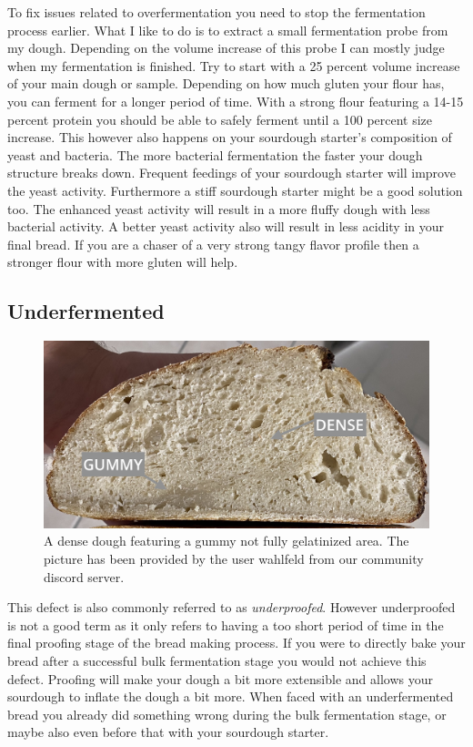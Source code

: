 To fix issues related to overfermentation you need to stop the fermentation process
earlier. What I like to do is to extract a small fermentation probe from my dough.
Depending on the volume increase of this probe I can mostly judge when my fermentation
is finished. Try to start with a 25 percent volume increase of your main dough or sample.
Depending on how much gluten your flour has, you can ferment for a longer period of time.
With a strong flour featuring a 14-15 percent protein you should be able to safely
ferment until a 100 percent size increase. This however also happens on your
sourdough starter's composition of yeast and bacteria. The more bacterial fermentation
the faster your dough structure breaks down. Frequent feedings of your sourdough
starter will improve the yeast activity. Furthermore a stiff sourdough starter
might be a good solution too. The enhanced yeast activity will result in a more fluffy
dough with less bacterial activity. A better yeast activity also will result
in less acidity in your final bread. If you are a chaser of a very strong tangy
flavor profile then a stronger flour with more gluten will help.


\subsection{Underfermented}

\begin{figure}
  \includegraphics[width=\textwidth]{fermented-too-short-underbaked}
  \caption{A dense dough featuring a gummy not fully gelatinized area.
  The picture has been provided by the user wahlfeld from our community discord server.}
  \label{fig:fermented-too-short-underbaked}
\end{figure}

This defect is also commonly referred to as {\it underproofed}. However underproofed
is not a good term as it only refers to having a too short period of time in the final
proofing stage of the bread making process. If you were to directly bake your bread
after a successful bulk fermentation stage you would not achieve this defect.
Proofing will make your dough a bit more extensible and allows your sourdough
to inflate the dough a bit more. When faced with an underfermented bread you
already did something wrong during the bulk fermentation stage, or maybe also
even before that with your sourdough starter.

